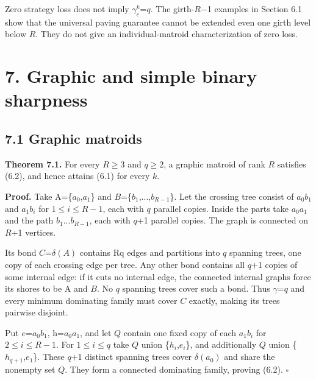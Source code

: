 \documentclass[11pt]{article}
\begin{document}
Zero strategy loss does not imply \(\gamma_c^k\)=\(q\). The girth-\(R\)\ensuremath{-}1 examples in Section 6.1 show that the universal paving guarantee cannot be extended even one girth level below \(R\). They do not give an individual-matroid characterization of zero loss.

\section*{7. Graphic and simple binary sharpness}

\subsection*{7.1 Graphic matroids}

\textbf{Theorem 7.1.} For every \(R\ge3\) and \(q\ge2\), a graphic matroid of rank \(R\) satisfies (6.2), and hence attains (6.1) for every \(k\).

\textbf{Proof.} Take A=\{\(a_0\),\(a_1\)\} and \(B\)=\{\(b_1\),...,\(b_{R-1}\)\}. Let the crossing tree consist of \(a_0b_1\) and \(a_1b_i\) for \(1\le i\le R-1\), each with \(q\) parallel copies. Inside the parts take \(a_0a_1\) and the path \(b_1\)...\(b_{R-1}\), each with \(q\)+1 parallel copies. The graph is connected on \(R\)+1 vertices.

Its bond \(C\)=\(\delta(A)\) contains Rq edges and partitions into \(q\) spanning trees, one copy of each crossing edge per tree. Any other bond contains all \(q\)+1 copies of some internal edge: if it cuts no internal edge, the connected internal graphs force its shores to be A and \(B\). No \(q\) spanning trees cover such a bond. Thus \(\gamma\)=\(q\) and every minimum dominating family must cover \(C\) exactly, making its trees pairwise disjoint.

Put \(e\)=\(a_0b_1\), h=\(a_0a_1\), and let \(Q\) contain one fixed copy of each \(a_1b_i\) for \(2\le i\le R-1\). For \(1\le i\le q\) take \(Q\) union \{\(h_i\),\(e_i\)\}, and additionally \(Q\) union \{\(h_{q+1}\),\(e_1\)\}. These \(q\)+1 distinct spanning trees cover \(\delta(a_0)\) and share the nonempty set \(Q\). They form a connected dominating family, proving (6.2). \hfill\ensuremath{\square}
\end{document}

